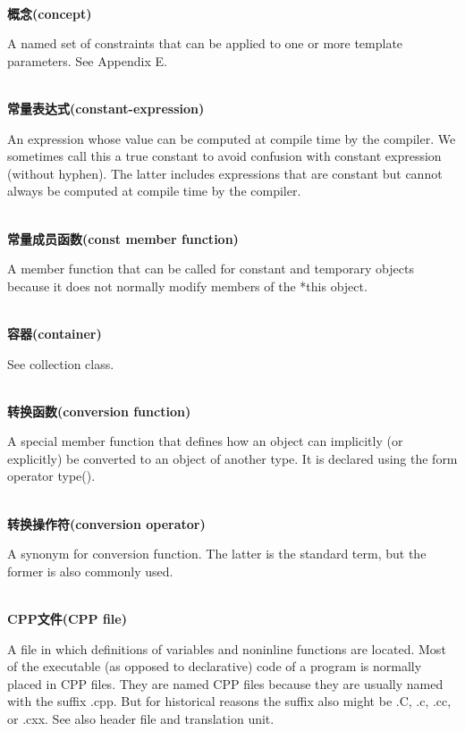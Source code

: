 \hspace*{\fill} \\ %
\noindent
\textbf{概念(concept)}

A named set of constraints that can be applied to one or more template parameters. See Appendix E.

\hspace*{\fill} \\ %
\noindent
\textbf{常量表达式(constant-expression)}

An expression whose value can be computed at compile time by the compiler. We sometimes call this a true constant to avoid confusion with constant expression (without hyphen). The latter includes expressions that are constant but cannot always be computed at compile time by the compiler.

\hspace*{\fill} \\ %
\noindent
\textbf{常量成员函数(const member function)}

A member function that can be called for constant and temporary objects because it does not normally modify members of the *this object.

\hspace*{\fill} \\ %
\noindent
\textbf{容器(container)}

See collection class.

\hspace*{\fill} \\ %
\noindent
\textbf{转换函数(conversion function)}

A special member function that defines how an object can implicitly (or explicitly) be converted to an object of another type. It is declared using the form operator type().

\hspace*{\fill} \\ %
\noindent
\textbf{转换操作符(conversion operator)}

A synonym for conversion function. The latter is the standard term, but the former is also commonly
used.

\hspace*{\fill} \\ %
\noindent
\textbf{CPP文件(CPP file)}

A file in which definitions of variables and noninline functions are located. Most of the executable  (as opposed to declarative) code of a program is normally placed in CPP files. They are named CPP files because they are usually named with the suffix .cpp. But for historical reasons the suffix also might be .C, .c, .cc, or .cxx. See also header file and translation unit.

